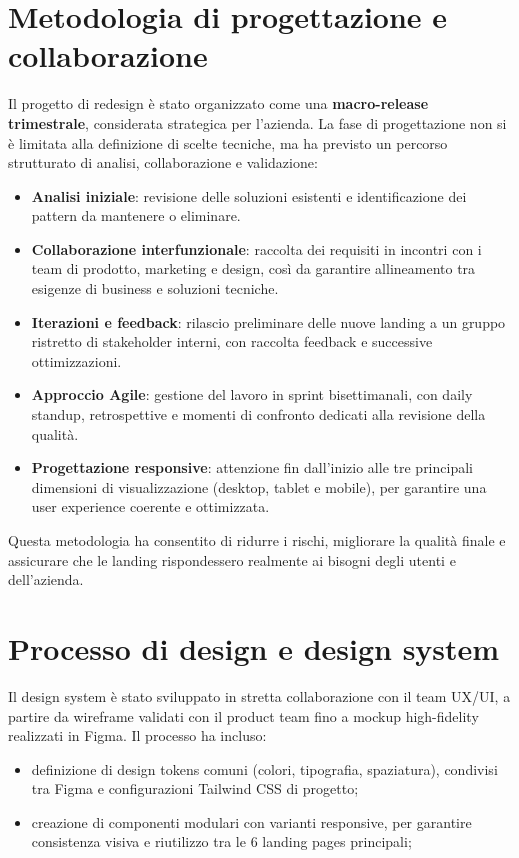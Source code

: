 \section{Metodologia di progettazione e collaborazione} 
Il progetto di redesign è stato organizzato come una \textbf{macro-release trimestrale},
considerata strategica per l'azienda. La fase di progettazione non si è limitata
alla definizione di scelte tecniche, ma ha previsto un percorso strutturato di
analisi, collaborazione e validazione:

\begin{itemize}
  \item \textbf{Analisi iniziale}: revisione delle soluzioni esistenti e
  identificazione dei pattern da mantenere o eliminare.
  \item \textbf{Collaborazione interfunzionale}: raccolta dei requisiti in
  incontri con i team di prodotto, marketing e design, così da garantire
  allineamento tra esigenze di business e soluzioni tecniche.
  \item \textbf{Iterazioni e feedback}: rilascio preliminare delle nuove landing
  a un gruppo ristretto di stakeholder interni, con raccolta feedback e successive
  ottimizzazioni.
  \item \textbf{Approccio Agile}: gestione del lavoro in sprint bisettimanali,
  con daily standup, retrospettive e momenti di confronto dedicati alla revisione
  della qualità.
  \item \textbf{Progettazione responsive}: attenzione fin dall'inizio alle tre
  principali dimensioni di visualizzazione (desktop, tablet e mobile), per
  garantire una user experience coerente e ottimizzata.
\end{itemize}

Questa metodologia ha consentito di ridurre i rischi, migliorare la qualità
finale e assicurare che le landing rispondessero realmente ai bisogni degli utenti
e dell'azienda.

\section{Processo di design e design system}
Il design system è stato sviluppato in stretta collaborazione con il team UX/UI,
a partire da wireframe validati con il product team fino a mockup
high-fidelity realizzati in Figma. Il processo ha incluso:

\begin{itemize}
  \item definizione di design tokens comuni (colori, tipografia, spaziatura),
  condivisi tra Figma e configurazioni Tailwind CSS di progetto;
  \item creazione di componenti modulari con varianti responsive, per garantire 
consistenza visiva e riutilizzo tra le 6 landing pages principali;
\end{itemize}

